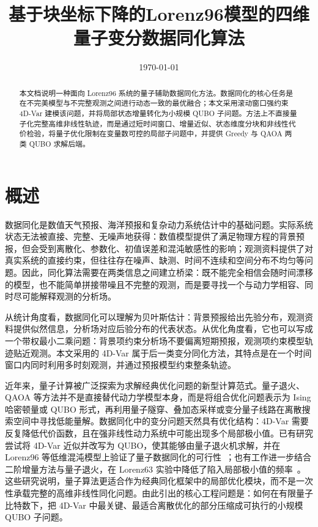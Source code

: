 \documentclass[UTF8,a4paper,12pt]{ctexart}
\title{基于块坐标下降的Lorenz96模型的四维量子变分数据同化算法}
\author{}
\date{\today}
\begin{document}
\maketitle

\begin{abstract}
本文档说明一种面向 Lorenz96 系统的量子辅助数据同化方法。数据同化的核心任务是在不完美模型与不完整观测之间进行动态一致的最优融合；本文采用滚动窗口强约束 4D-Var 建模该问题，并将局部状态增量转化为小规模 QUBO 子问题。方法上不直接量子化完整高维非线性轨迹，而是通过短时间窗口、增量近似、状态维度分块和非线性代价检验，将量子优化限制在变量数可控的局部子问题中，并提供 Greedy 与 QAOA 两类 QUBO 求解后端。
\end{abstract}

\tableofcontents
\newpage

\section{概述}

数据同化是数值天气预报、海洋预报和复杂动力系统估计中的基础问题。实际系统状态无法被直接、完整、无噪声地获得：数值模型提供了满足物理方程的背景预报，但会受到离散化、参数化、初值误差和混沌敏感性的影响；观测资料提供了对真实系统的直接约束，但往往存在噪声、缺测、时间不连续和空间分布不均匀等问题。因此，同化算法需要在两类信息之间建立桥梁：既不能完全相信会随时间漂移的模型，也不能简单拼接带噪且不完整的观测，而是要寻找一个与动力学相容、同时尽可能解释观测的分析场。

从统计角度看，数据同化可以理解为贝叶斯估计：背景预报给出先验分布，观测资料提供似然信息，分析场对应后验分布的代表状态。从优化角度看，它也可以写成一个带权最小二乘问题：背景项约束分析场不要偏离短期预报，观测项约束模型轨迹贴近观测。本文采用的 4D-Var 属于后一类变分同化方法，其特点是在一个时间窗口内同时利用多时刻观测，并通过预报模型约束整条轨迹。

近年来，量子计算被广泛探索为求解经典优化问题的新型计算范式。量子退火、QAOA 等方法并不是直接替代动力学模型本身，而是将组合优化问题表示为 Ising 哈密顿量或 QUBO 形式，再利用量子隧穿、叠加态采样或变分量子线路在离散搜索空间中寻找低能量解。数据同化中的变分问题天然具有优化结构：4D-Var 需要反复降低代价函数，且在强非线性动力系统中可能出现多个局部极小值。已有研究尝试将 4D-Var 近似并改写为 QUBO，使其能够由量子退火机求解，并在 Lorenz96 等低维混沌模型上验证了量子数据同化的可行性~\cite{kotsuki2024quantum}；也有工作进一步结合二阶增量方法与量子退火，在 Lorenz63 实验中降低了陷入局部极小值的频率~\cite{tsuyuki2025secondorder}。这些研究说明，量子算法更适合作为经典同化框架中的局部优化模块，而不是一次性承载完整的高维非线性同化问题。由此引出的核心工程问题是：如何在有限量子比特数下，把 4D-Var 中最关键、最适合离散优化的部分压缩成可执行的小规模 QUBO 子问题。
\end{document}
